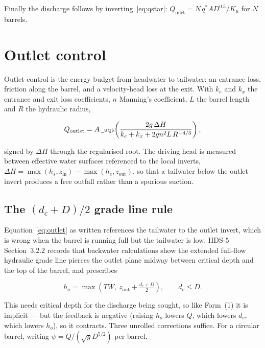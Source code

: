 \documentclass[11pt,a4paper]{article}
\newcommand{\code}[1]{\texttt{\small #1}}
\begin{document}
\noindent
Finally the discharge follows by inverting~\eqref{eq:qstar}:
$Q_{\mathrm{inlet}} = N\,q^{*}A D^{0.5}/K_u$ for $N$ barrels.

\section{Outlet control}\label{sec:outlet}

Outlet control is the energy budget from headwater to tailwater: an entrance
loss, friction along the barrel, and a velocity-head loss at the exit. With
$k_e$ and $k_x$ the entrance and exit loss coefficients, $n$ Manning's
coefficient, $L$ the barrel length and $R$ the hydraulic radius,

\begin{equation}
Q_{\mathrm{outlet}}
 = A\,\text{\code{\_sqt}}\!\left(
   \frac{2g\,\Delta H}{k_e+k_x+2gn^{2}L\,R^{-4/3}}\right),
\label{eq:outlet}
\end{equation}

\noindent
signed by $\Delta H$ through the regularised root. The driving head is measured
between effective water surfaces referenced to the local inverts,
$\Delta H=\max(h_s,z_{\mathrm{in}})-\max(h_e,z_{\mathrm{out}})$, so that a
tailwater below the outlet invert produces a free outfall rather than a
spurious suction.

\subsection{The \texorpdfstring{$(d_c+D)/2$}{(dc+D)/2} grade line rule}\label{sec:hgl}

Equation~\eqref{eq:outlet} as written references the tailwater to the outlet
invert, which is wrong when the barrel is running full but the tailwater is low.
HDS-5 Section~3.2.2 records that backwater calculations show the extended
full-flow hydraulic grade line pierces the outlet plane midway between critical
depth and the top of the barrel, and prescribes

\begin{equation}
h_o=\max\!\left(TW,\ z_{\mathrm{out}}+\tfrac{d_c+D}{2}\right),\qquad d_c\le D.
\label{eq:hgl}
\end{equation}

\noindent
This needs critical depth for the discharge being sought, so like Form~(1) it is
implicit --- but the feedback is negative (raising $h_o$ lowers $Q$, which lowers
$d_c$, which lowers $h_o$), so it contracts. Three unrolled corrections suffice.
For a circular barrel, writing $\psi=Q/(\sqrt{g}D^{5/2})$ per barrel,
\end{document}

